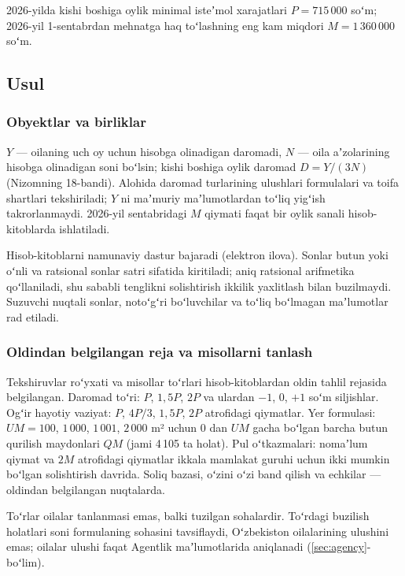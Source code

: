 \documentclass[14pt,a4paper]{extarticle}
\begin{document}
2026-yilda kishi boshiga oylik minimal isteʼmol xarajatlari $P=715\,000$ soʻm\cite{mpr}; 2026-yil 1-sentabrdan mehnatga haq toʻlashning eng kam miqdori $M=1\,360\,000$ soʻm\cite{mrot}.

\subsection{Usul}
\subsubsection{Obyektlar va birliklar}
$Y$ — oilaning uch oy uchun hisobga olinadigan daromadi, $N$ — oila aʼzolarining hisobga olinadigan soni boʻlsin; kishi boshiga oylik daromad $D=Y/(3N)$ (Nizomning 18-bandi). Alohida daromad turlarining ulushlari formulalari va toifa shartlari tekshiriladi; $Y$ ni maʼmuriy maʼlumotlardan toʻliq yigʻish takrorlanmaydi. 2026-yil sentabridagi $M$ qiymati faqat bir oylik sanali hisob-kitoblarda ishlatiladi.

Hisob-kitoblarni namunaviy dastur bajaradi (elektron ilova). Sonlar butun yoki oʻnli va ratsional sonlar satri sifatida kiritiladi; aniq ratsional arifmetika qoʻllaniladi, shu sababli tenglikni solishtirish ikkilik yaxlitlash bilan buzilmaydi. Suzuvchi nuqtali sonlar, notoʻgʻri boʻluvchilar va toʻliq boʻlmagan maʼlumotlar rad etiladi.

\subsubsection{Oldindan belgilangan reja va misollarni tanlash}
Tekshiruvlar roʻyxati va misollar toʻrlari hisob-kitoblardan oldin tahlil rejasida belgilangan. Daromad toʻri: $P$, $1{,}5P$, $2P$ va ulardan $-1$, $0$, $+1$ soʻm siljishlar. Ogʻir hayotiy vaziyat: $P$, $4P/3$, $1{,}5P$, $2P$ atrofidagi qiymatlar. Yer formulasi: $UM=100$, $1\,000$, $1\,001$, $2\,000$ m² uchun $0$ dan $UM$ gacha boʻlgan barcha butun qurilish maydonlari $QM$ (jami 4\,105 ta holat). Pul oʻtkazmalari: nomaʼlum qiymat va $2M$ atrofidagi qiymatlar ikkala mamlakat guruhi uchun ikki mumkin boʻlgan solishtirish davrida. Soliq bazasi, oʻzini oʻzi band qilish va echkilar — oldindan belgilangan nuqtalarda.

Toʻrlar oilalar tanlanmasi emas, balki tuzilgan sohalardir. Toʻrdagi buzilish holatlari soni formulaning sohasini tavsiflaydi, Oʻzbekiston oilalarining ulushini emas; oilalar ulushi faqat Agentlik maʼlumotlarida aniqlanadi (\ref{sec:agency}-boʻlim).
\end{document}
